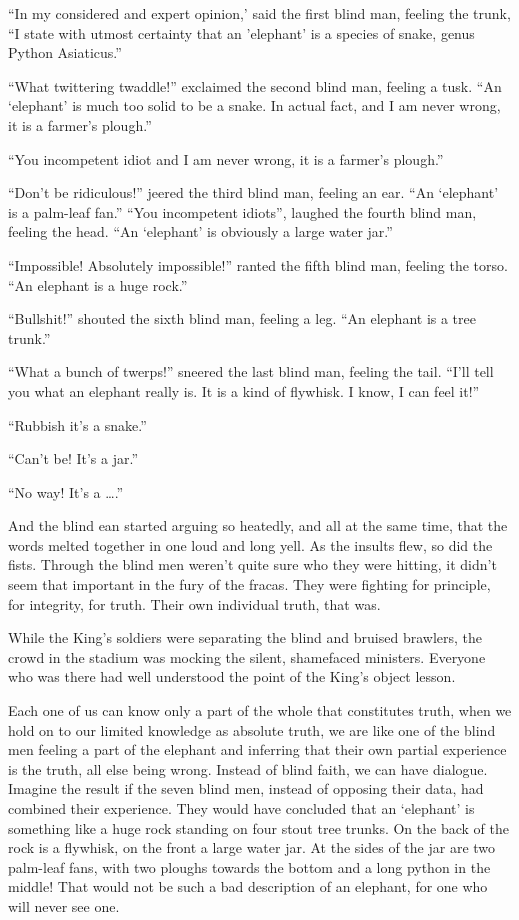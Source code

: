 \documentclass[11pt, openany]{book}
\begin{document}
“In my considered and expert opinion,’ said the first blind man, feeling the trunk, “I state with utmost certainty that an ’elephant’ is a species of snake, genus Python Asiaticus.”

“What twittering twaddle!” exclaimed the second blind man, feeling a tusk. “An ‘elephant’ is much too solid to be a snake. In actual fact, and I am never wrong, it is a farmer’s plough.”

“You incompetent idiot and I am never wrong, it is a farmer’s plough.”

“Don’t be ridiculous!” jeered the third blind man, feeling an ear. “An ‘elephant’ is a palm-leaf fan.”
“You incompetent idiots”, laughed the fourth blind man, feeling the head. “An ‘elephant’ is obviously a large water jar.”

“Impossible! Absolutely impossible!” ranted the fifth blind man, feeling the torso. “An elephant is a huge rock.”

“Bullshit!” shouted the sixth blind man, feeling a leg. “An elephant is a tree trunk.”

“What a bunch of twerps!” sneered the last blind man, feeling the tail. “I’ll tell you what an elephant really is. It is a kind of flywhisk. I know, I can feel it!”

“Rubbish it’s a snake.”

“Can’t be! It’s a jar.”

“No way! It’s a ….”

And the blind ean started arguing so heatedly, and all at the same time, that the words melted together in one loud and long yell. As the insults flew, so did the fists. Through the blind men weren’t quite sure who they were hitting, it didn’t seem that important in the fury of the fracas. They were fighting for principle, for integrity, for truth. Their own individual truth, that was.

While the King’s soldiers were separating the blind and bruised brawlers, the crowd in the stadium was mocking the silent, shamefaced ministers. Everyone who was there had well understood the point of the King’s object lesson.

Each one of us can know only a part of the whole that constitutes truth, when we hold on to our limited knowledge as absolute truth, we are like one of the blind men feeling a part of the elephant and inferring that their own partial experience is the truth, all else being wrong. Instead of blind faith, we can have dialogue. Imagine the result if the seven blind men, instead of opposing their data, had combined their experience. They would have concluded that an ‘elephant’ is something like a huge rock standing on four stout tree trunks. On the back of the rock is a flywhisk, on the front a large water jar. At the sides of the jar are two palm-leaf fans, with two ploughs towards the bottom and a long python in the middle! That would not be such a bad description of an elephant, for one who will never see one.
\end{document}
